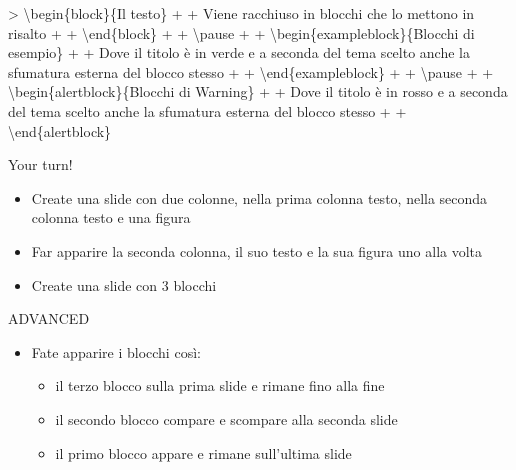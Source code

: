 \documentclass[
  ignorenonframetext,
]{beamer}
\newenvironment{Shaded}{}{}
\newcommand{\ExtensionTok}[1]{#1}
\newcommand{\FunctionTok}[1]{#1}
\newcommand{\KeywordTok}[1]{\textcolor[rgb]{0.00,0.00,1.00}{#1}}
\newcommand{\NormalTok}[1]{#1}
\providecommand{\tightlist}{%
  \setlength{\itemsep}{0pt}\setlength{\parskip}{0pt}}
\begin{document}
\begin{frame}[fragile]{}
\protect\hypertarget{section-8}{}
\footnotesize

\begin{Shaded}
\begin{Highlighting}[]
\NormalTok{\textgreater{} }\KeywordTok{\textbackslash{}begin}\NormalTok{\{}\ExtensionTok{block}\NormalTok{\}\{Il testo\}}
\NormalTok{+ }
\NormalTok{+ Viene racchiuso in blocchi che lo mettono in risalto}
\NormalTok{+ }
\NormalTok{+ }\KeywordTok{\textbackslash{}end}\NormalTok{\{}\ExtensionTok{block}\NormalTok{\}}
\NormalTok{+ }
\NormalTok{+ }\FunctionTok{\textbackslash{}pause}
\NormalTok{+ }
\NormalTok{+ }\KeywordTok{\textbackslash{}begin}\NormalTok{\{}\ExtensionTok{exampleblock}\NormalTok{\}\{Blocchi di esempio\}}
\NormalTok{+ }
\NormalTok{+ Dove il titolo è in verde e a seconda del tema scelto anche la sfumatura esterna del blocco stesso}
\NormalTok{+ }
\NormalTok{+ }\KeywordTok{\textbackslash{}end}\NormalTok{\{}\ExtensionTok{exampleblock}\NormalTok{\}}
\NormalTok{+ }
\NormalTok{+ }\FunctionTok{\textbackslash{}pause}
\NormalTok{+ }
\NormalTok{+ }\KeywordTok{\textbackslash{}begin}\NormalTok{\{}\ExtensionTok{alertblock}\NormalTok{\}\{Blocchi di Warning\}}
\NormalTok{+ }
\NormalTok{+ Dove il titolo è in rosso e a seconda del tema scelto anche la sfumatura esterna del blocco stesso}
\NormalTok{+ }
\NormalTok{+ }\KeywordTok{\textbackslash{}end}\NormalTok{\{}\ExtensionTok{alertblock}\NormalTok{\}}
\end{Highlighting}
\end{Shaded}
\end{frame}

\begin{frame}{Your turn!}
\protect\hypertarget{your-turn-2}{}
\begin{itemize}
\item
  Create una slide con due colonne, nella prima colonna testo, nella
  seconda colonna testo e una figura
\item
  Far apparire la seconda colonna, il suo testo e la sua figura uno alla
  volta
\item
  Create una slide con 3 blocchi
\end{itemize}

\begin{center}
ADVANCED
\end{center}

\begin{itemize}
\tightlist
\item
  Fate apparire i blocchi così:

  \begin{itemize}
  \tightlist
  \item
    il terzo blocco sulla prima slide e rimane fino alla fine
  \item
    il secondo blocco compare e scompare alla seconda slide
  \item
    il primo blocco appare e rimane sull'ultima slide
  \end{itemize}
\end{itemize}
\end{frame}
\end{document}
